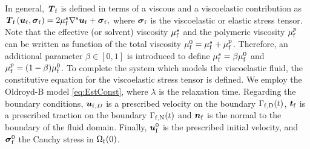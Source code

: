 \documentclass[11pt,english]{article}
\def\ufluid{\boldsymbol{u}_{\rm{f}}}
\def\ufluidD{\boldsymbol{u}_{{\rm{f}},D}}
\def\sigmafluid{\boldsymbol{\sigma}_{\rm{f}}}
\def\viscs{\mu^{s}_{\rm{f}}}
\def\viscp{\mu^{p}_{\rm{f}}}
\begin{document}
In general, $\textbf{\textit{T}}_{\text{f}}$ is defined in terms of a viscous and a viscoelastic contribution as $\textbf{\textit{T}}_{\text{f}}\left( \ufluid,\sigmafluid \right)=2\viscs\nabla^{\rm s}\ufluid+\sigmafluid,$ where $\sigmafluid$ is the viscoelastic or elastic stress tensor. Note that the effective (or solvent) viscosity $\viscs$ and the polymeric viscosity $\viscp$ can be written as function of the total viscosity $\mu^0_{\rm{f}}=\viscs + \viscp$. Therefore, an additional parameter $\beta\in[0,1]$ is introduced to define $\viscs=\beta\mu^0_{\rm{f}}$ and $\viscp=(1-\beta)\mu^0_{\rm{f}}$. 
To complete the system which models the viscoelastic fluid, the constitutive equation for the viscoelastic stress tensor is defined. We employ the Oldroyd-B model \eqref{eq:EstConst}, where $\lambda$ is the relaxation time. Regarding the boundary conditions, $\ufluidD$ is a prescribed velocity on the boundary $\Gamma_{\rm{f},D}(t)$, $\boldsymbol{t}_{\rm{f}}$ is a prescribed traction on the boundary $\Gamma_{\rm{f},N}(t)$ and $\boldsymbol{n}_{\rm{f}}$ is the normal to the boundary of the fluid domain. Finally, $\ufluid^0$ is the prescribed initial velocity, and $\sigmafluid^0$ the Cauchy stress in $\Omega_{\rm{f}}(0)$.
\end{document}
